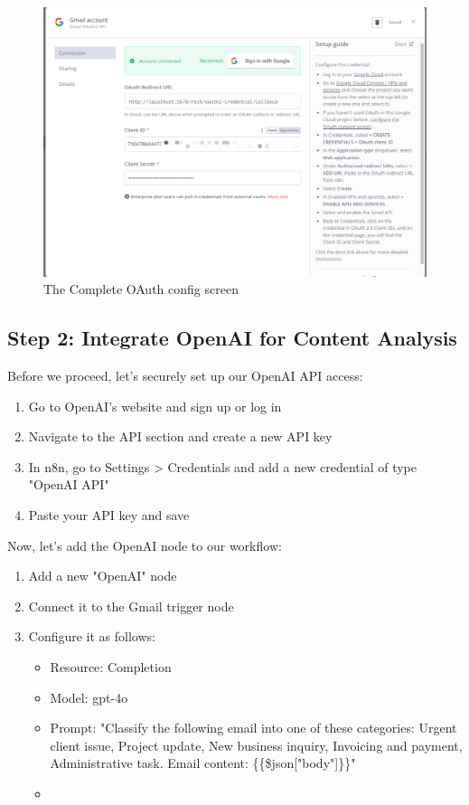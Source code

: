 \begin{figure}[h]
    \centering
    \includegraphics[scale=0.35]{./figures/01-n8n-gmail-oauth-config}
    \caption{The Complete OAuth config screen}
    \label{fig:01-gmail-config}
\end{figure}

\subsection{Step 2: Integrate OpenAI for Content Analysis}

Before we proceed, let's securely set up our OpenAI API access:

\begin{enumerate}
    \item Go to OpenAI's website and sign up or log in
    \item Navigate to the API section and create a new API key
    \item In n8n, go to Settings > Credentials and add a new credential of type "OpenAI API"
    \item Paste your API key and save
\end{enumerate}

Now, let's add the OpenAI node to our workflow:

\begin{enumerate}
    \item Add a new "OpenAI" node
    \item Connect it to the Gmail trigger node
    \item Configure it as follows:
    \begin{itemize}
        \item Resource: Completion
        \item Model: gpt-4o
        \item Prompt: "Classify the following email into one of these categories: Urgent client issue, Project update, New business inquiry, Invoicing and payment, Administrative task. Email content: \{\{\$json["body"]\}\}"
        \item
    \end{itemize}
\end{enumerate}

